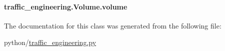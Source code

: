 \hypertarget{classtraffic__engineering_1_1Volume_a136564cea8714d5127cdbe077d321181}{
\paragraph[{volume}]{\setlength{\rightskip}{0pt plus 5cm}traffic\-\_\-engineering.\-Volume.\-volume}}\label{classtraffic__engineering_1_1Volume_a136564cea8714d5127cdbe077d321181}


The documentation for this class was generated from the following file\-:\begin{DoxyCompactItemize}
\item 
python/\hyperlink{traffic__engineering_8py}{traffic\-\_\-engineering.\-py}\end{DoxyCompactItemize}
